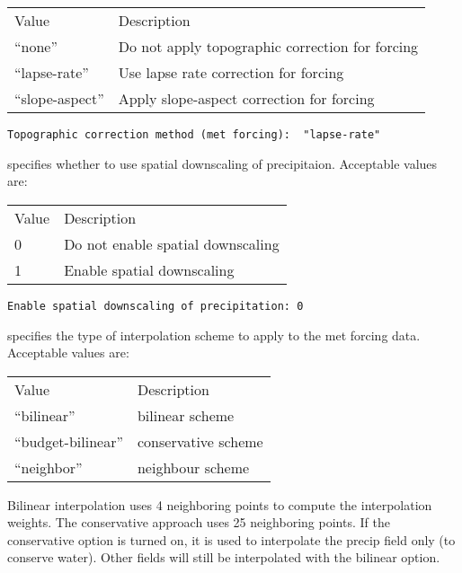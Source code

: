  \begin{tabular}{ll}
 Value          & Description                                       \\
 ``none''         & Do not apply topographic correction for forcing \\
 ``lapse-rate''   & Use lapse rate correction for forcing           \\
 ``slope-aspect'' & Apply slope-aspect correction for forcing       \\
 \end{tabular}
 

 \begin{Verbatim}[frame=single]
Topographic correction method (met forcing):  "lapse-rate"
 \end{Verbatim}

 
  specifies whether
 to use spatial downscaling of precipitaion.
 Acceptable values are:

 \begin{tabular}{ll}
 Value & Description                       \\
 0     & Do not enable spatial downscaling \\
 1     & Enable spatial downscaling        \\
 \end{tabular}
 

 \begin{Verbatim}[frame=single]
Enable spatial downscaling of precipitation: 0
 \end{Verbatim}

 
 specifies the type of interpolation scheme to
 apply to the met forcing data.
 Acceptable values are:

 \begin{tabular}{ll}
 Value               & Description                              \\
 ``bilinear''        & bilinear scheme                          \\
 ``budget-bilinear'' & conservative scheme                      \\
 ``neighbor''        & neighbour scheme                         \\
 \end{tabular}

 Bilinear interpolation uses 4 neighboring points to compute the
 interpolation weights. The conservative approach uses 25 neighboring
 points. If the conservative
 option is turned on, it is used to interpolate the precip field only (to
 conserve water). Other fields will still be interpolated with the
 bilinear option.
 

